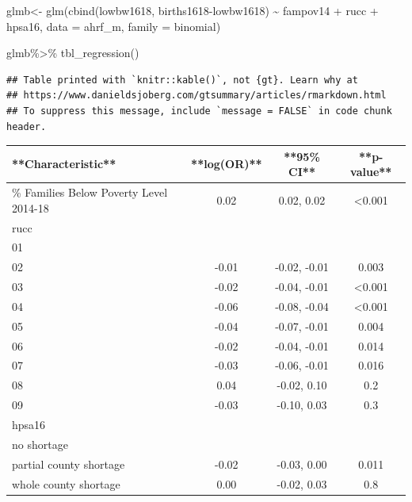 \documentclass[
]{article}
\newenvironment{Shaded}{\begin{snugshade}}{\end{snugshade}}
\newcommand{\AttributeTok}[1]{\textcolor[rgb]{0.77,0.63,0.00}{#1}}
\newcommand{\FunctionTok}[1]{\textcolor[rgb]{0.00,0.00,0.00}{#1}}
\newcommand{\NormalTok}[1]{#1}
\newcommand{\OtherTok}[1]{\textcolor[rgb]{0.56,0.35,0.01}{#1}}
\newcommand{\SpecialCharTok}[1]{\textcolor[rgb]{0.00,0.00,0.00}{#1}}
\begin{document}
\begin{Shaded}
\begin{Highlighting}[]
\NormalTok{glmb}\OtherTok{\textless{}{-}} \FunctionTok{glm}\NormalTok{(}\FunctionTok{cbind}\NormalTok{(lowbw1618, births1618}\SpecialCharTok{{-}}\NormalTok{lowbw1618) }\SpecialCharTok{\textasciitilde{}}\NormalTok{  fampov14 }\SpecialCharTok{+}\NormalTok{ rucc }\SpecialCharTok{+}\NormalTok{ hpsa16,}
          \AttributeTok{data =}\NormalTok{ ahrf\_m, }
          \AttributeTok{family =}\NormalTok{ binomial)}

\NormalTok{glmb}\SpecialCharTok{\%\textgreater{}\%}
  \FunctionTok{tbl\_regression}\NormalTok{()}
\end{Highlighting}
\end{Shaded}

\begin{verbatim}
## Table printed with `knitr::kable()`, not {gt}. Learn why at
## https://www.danieldsjoberg.com/gtsummary/articles/rmarkdown.html
## To suppress this message, include `message = FALSE` in code chunk header.
\end{verbatim}

\begin{tabular}{l|c|c|c}
\hline
**Characteristic** & **log(OR)** & **95\% CI** & **p-value**\\
\hline
\% Families Below Poverty Level 2014-18 & 0.02 & 0.02, 0.02 & <0.001\\
\hline
rucc &  &  & \\
\hline
01 &  &  & \\
\hline
02 & -0.01 & -0.02, -0.01 & 0.003\\
\hline
03 & -0.02 & -0.04, -0.01 & <0.001\\
\hline
04 & -0.06 & -0.08, -0.04 & <0.001\\
\hline
05 & -0.04 & -0.07, -0.01 & 0.004\\
\hline
06 & -0.02 & -0.04, -0.01 & 0.014\\
\hline
07 & -0.03 & -0.06, -0.01 & 0.016\\
\hline
08 & 0.04 & -0.02, 0.10 & 0.2\\
\hline
09 & -0.03 & -0.10, 0.03 & 0.3\\
\hline
hpsa16 &  &  & \\
\hline
no shortage &  &  & \\
\hline
partial county shortage & -0.02 & -0.03, 0.00 & 0.011\\
\hline
whole county shortage & 0.00 & -0.02, 0.03 & 0.8\\
\hline
\end{tabular}
\end{document}
